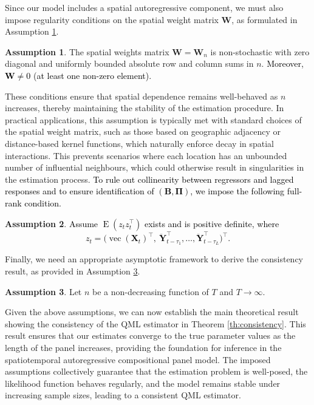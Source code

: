 \documentclass[12pt]{article}
\theoremstyle{plain}
\theoremstyle{definition}
\DeclareMathOperator{\vop}{vec}
\newcommand{\xvec}{\boldsymbol}
\newcommand{\xmat}{\mathbf}
\DeclareMathOperator{\E}{E}
\newtheorem{assumption}{Assumption}
\begin{document}
Since our model includes a spatial autoregressive component, we must also impose regularity conditions on the spatial weight matrix \( \xmat{W} \), as formulated in Assumption \ref{ass:W_cons}.  

\begin{assumption}\label{ass:W_cons}
The spatial weights matrix $\xmat{W} = \xmat{W}_n$ is non-stochastic with zero diagonal and uniformly bounded absolute row and column sums in $n$. \textcolor{black}{Moreover, $\xmat{W} \neq 0$ (at least one non-zero element).}
\end{assumption}


These conditions ensure that spatial dependence remains well-behaved as $n$ increases, thereby maintaining the stability of the estimation procedure. In practical applications, this assumption is typically met with standard choices of the spatial weight matrix, such as those based on geographic adjacency or distance-based kernel functions, which naturally enforce decay in spatial interactions. This prevents scenarios where each location has an unbounded number of influential neighbours, which could otherwise result in singularities in the estimation process. \textcolor{black}{To rule out collinearity between regressors and lagged responses and to ensure identification of $(\xmat{B},\xmat{\Pi})$, we impose the following full-rank condition.}


\begin{assumption}\label{ass:rank_id_cons}
\textcolor{black}{Assume $\E(z_t z_t^\top)$ exists and is positive definite, where
\[
z_t=\Big(\vop(\xmat{X}_t)^\top,\ \ddot{\xvec{Y}}_{t-\tau_1}^\top,\ldots,\ddot{\xvec{Y}}_{t-\tau_L}^\top\Big)^\top .
\]}
\end{assumption}

Finally, we need an appropriate asymptotic framework to derive the consistency result, as provided in Assumption \ref{ass:asymptotics_cons}. 

 \begin{assumption}\label{ass:asymptotics_cons}
	Let $n$ be a non-decreasing function of $T$ and $T \to \infty$.
\end{assumption}

Given the above assumptions, we can now establish the main theoretical result showing the consistency of the QML estimator in Theorem \ref{th:consistency}. This result ensures that our estimates converge to the true parameter values as the length of the panel increases, providing the foundation for inference in the spatiotemporal autoregressive compositional panel model. The imposed assumptions collectively guarantee that the estimation problem is well-posed, the likelihood function behaves regularly, and the model remains stable under increasing sample sizes, leading to a consistent QML estimator.
\end{document}
